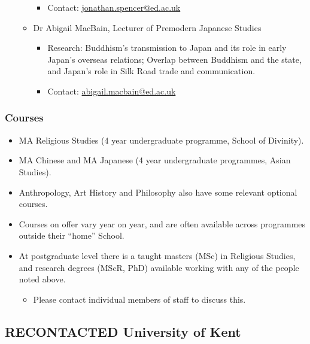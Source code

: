 \documentclass[11pt]{article}
\begin{document}
\begin{itemize}
\begin{itemize}
\begin{itemize}
\item Contact: \href{mailto:jonathan.spencer@ed.ac.uk}{jonathan.spencer@ed.ac.uk}\\
\end{itemize}
\item Dr Abigail MacBain, Lecturer of Premodern Japanese Studies
\label{sec:orgdeb4aad}
\begin{itemize}
\item Research: Buddhism's transmission to Japan and its role in early Japan's overseas relations; Overlap between Buddhism and the state, and Japan's role in Silk Road trade and communication.\\
\item Contact: \href{mailto:abigail.macbain@ed.ac.uk}{abigail.macbain@ed.ac.uk}\\
\end{itemize}
\end{itemize}
\end{itemize}
\subsubsection*{Courses}
\label{sec:org39bd914}
\begin{itemize}
\item MA Religious Studies (4 year undergraduate programme, School of Divinity).\\
\item MA Chinese and MA Japanese (4 year undergraduate programmes, Asian Studies).\\
\item Anthropology, Art History and Philosophy also have some relevant optional courses.\\
\item Courses on offer vary year on year, and are often available across programmes outside their “home” School.\\
\item At postgraduate level there is a taught masters (MSc) in Religious Studies, and research degrees (MScR, PhD) available working with any of the people noted above.\\
\begin{itemize}
\item Please contact individual members of staff to discuss this.\\
\end{itemize}
\end{itemize}
\subsection*{{\bfseries\sffamily RECONTACTED} University of Kent}
\label{sec:org63d7b2a}
\end{document}
